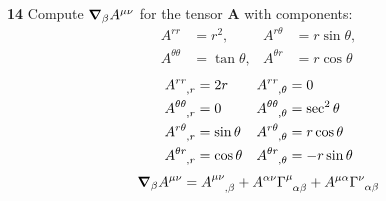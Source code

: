 \message{ !name(gr-ch5-notes.tex)}\documentclass[gr-notes.tex]{subfiles}
\begin{document}
\textbf{14}
Compute $\grad_\beta A^{\mu\nu}$ for the tensor $\boldsymbol{A}$ with components:
%
\begin{align*}
  A^{rr} &= r^2, & A^{r\theta} &= r \sin\theta,
  \\
  A^{\theta\theta} &= \tan\theta, & A^{\theta r} &= r \cos\theta
\end{align*}
%
\begin{align*}
  \tensor{A}{^{rr}_{,r}} &= 2r &
  \tensor{A}{^{rr}_{,\theta}} &= 0
  \\
  \tensor{A}{^{\theta\theta}_{,r}} &= 0 &
  \tensor{A}{^{\theta\theta}_{,\theta}} &= \sec^2\theta
  \\
  \tensor{A}{^{r\theta}_{,r}} &= \sin\theta &
  \tensor{A}{^{r\theta}_{,\theta}} &= r \cos\theta
  \\
  \tensor{A}{^{\theta r}_{,r}} &= \cos\theta &
  \tensor{A}{^{\theta r}_{,\theta}} &= -r \sin\theta
\end{align*}
%
\begin{displaymath}
  \grad_\beta A^{\mu \nu} =
  \tensor{A}{^{\mu \nu}_{,\beta}} +
  A^{\alpha \nu} \tensor{\Gamma}{^\mu_{\alpha \beta}} +
  A^{\mu \alpha} \tensor{\Gamma}{^\nu_{\alpha \beta}}
\end{displaymath}
%
\end{document}
